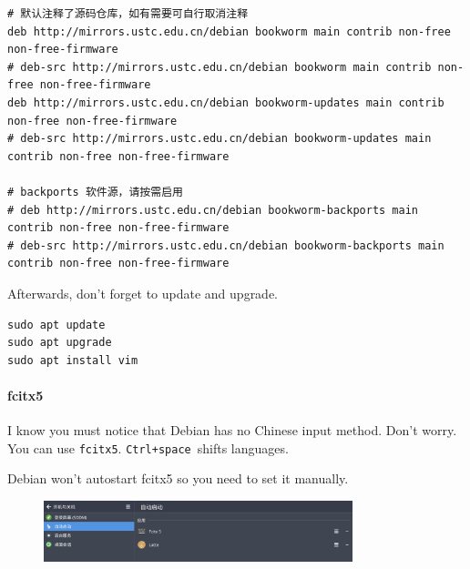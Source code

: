 \documentclass[12pt]{ctexart}
\newenvironment{mdquote}
{%
  \par\noindent
  \begin{list}{}{%
      \setlength{\leftmargin}{1em}%
      \setlength{\rightmargin}{0pt}%
      \setlength{\itemindent}{0pt}%
      \setlength{\listparindent}{\parindent}%
      \setlength{\topsep}{0.5\baselineskip}%
  }
  \item[\textbf{>}\ ]\itshape
}
{\end{list}\par}
\begin{document}
\fontsize{7}{9}
\begin{adjustwidth}{2em}{0pt}
\begin{verbatim}
# 默认注释了源码仓库，如有需要可自行取消注释
deb http://mirrors.ustc.edu.cn/debian bookworm main contrib non-free non-free-firmware
# deb-src http://mirrors.ustc.edu.cn/debian bookworm main contrib non-free non-free-firmware
deb http://mirrors.ustc.edu.cn/debian bookworm-updates main contrib non-free non-free-firmware
# deb-src http://mirrors.ustc.edu.cn/debian bookworm-updates main contrib non-free non-free-firmware

# backports 软件源，请按需启用
# deb http://mirrors.ustc.edu.cn/debian bookworm-backports main contrib non-free non-free-firmware
# deb-src http://mirrors.ustc.edu.cn/debian bookworm-backports main contrib non-free non-free-firmware
\end{verbatim}
\end{adjustwidth}
\fontsize{12}{14}

Afterwards, don't forget to update and upgrade.

\begin{adjustwidth}{2em}{0pt}
\begin{verbatim}
sudo apt update
sudo apt upgrade
sudo apt install vim
\end{verbatim}
\end{adjustwidth}

\paragraph{\textbf{fcitx5}}\par
\vspace{1em}
I know you must notice that Debian has no Chinese input method.
Don't worry. You can use \texttt{fcitx5}.
\texttt{Ctrl+space}\ shifts languages.

\begin{mdquote}
Debian won't autostart fcitx5 so you need to set it manually.
\end{mdquote}

\begin{figure}[H]
    \centering
    \includegraphics[width=0.8\textwidth,keepaspectratio]{assets/Linux/3.1 Seek common ground while reserving differences/11.png}
\end{figure}
\end{document}

